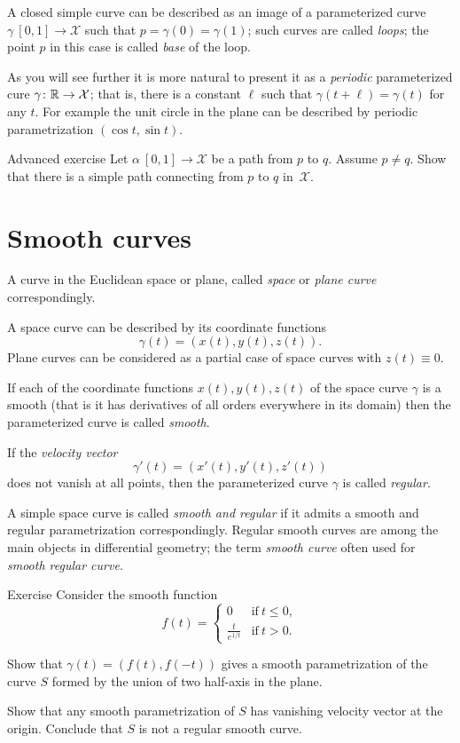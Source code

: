 A closed simple curve can be described as an image of a parameterized curve $\gamma\: [0,1]\to \mathcal{X}$ such that $p=\gamma(0)=\gamma(1)$;
such curves are called \emph{loops}; 
the point $p$ in this case is called \emph{base} of the loop.

As you will see further it is more natural to present it as a \emph{periodic} parameterized cure $\gamma\colon \mathbb{R}\to \mathcal{X}$; that is, there is a constant $\ell$ such that $\gamma(t+\ell)=\gamma(t)$ for any $t$.
For example the unit circle in the plane can be described by periodic parametrization $(\cos t,\sin t)$.

\begin{thm}{Advanced exercise}
Let $\alpha\:[0,1]\to\mathcal{X}$ be a path from $p$ to $q$.
Assume $p\ne q$.
Show that there is a simple path connecting from $p$ to $q$ in~$\mathcal{X}$.
\end{thm}

\section*{Smooth curves}

A curve in the Euclidean space or plane, called \emph{space} or \emph{plane curve} correspondingly.

A space curve can be described by its coordinate functions 
\[\gamma(t)=(x(t),y(t),z(t)).\]
Plane curves can be considered as a partial case of space curves with $z(t)\equiv 0$.

If each of the coordinate functions $x(t),y(t),z(t)$ of the space curve $\gamma$ is a smooth (that is it has derivatives of all orders everywhere in its domain) then the parameterized curve is called \emph{smooth}.

If the \emph{velocity vector} 
\[\gamma'(t)=(x'(t),y'(t),z'(t))\] 
does not vanish at all points, then the parameterized curve $\gamma$ is called \emph{regular}.

A simple space curve is called \emph{smooth and regular} if it admits a smooth and regular parametrization correspondingly.
Regular smooth curves are among the main objects in differential geometry;
the term \emph{smooth curve} often used for \emph{smooth regular curve}. 

\begin{thm}{Exercise}\label{ex:L-shape}
Consider the smooth function 
\[f(t)=
\begin{cases}
0&\text{if}\ t\le 0,
\\
\frac{t}{e^{1\!/\!t}}&\text{if}\ t> 0.
\end{cases}
\]

Show that $\gamma(t)=(f(t),f(-t))$ gives a smooth parametrization of the curve $S$ formed by the union of two half-axis in the plane.

Show that any smooth parametrization of $S$ has vanishing velocity vector at the origin.
Conclude that $S$ is not a regular smooth curve.
\end{thm}


